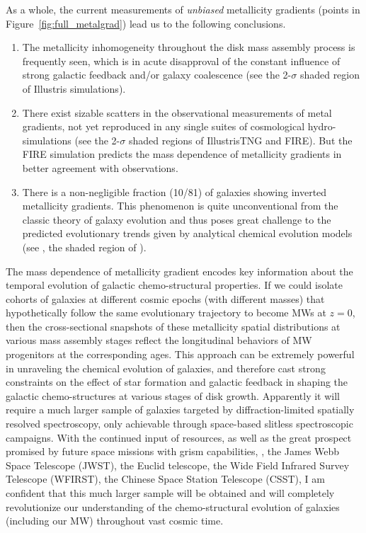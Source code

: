 As a whole, the current measurements of \emph{unbiased} metallicity gradients (points in Figure~\ref{fig:full_metalgrad}) lead us to the following conclusions.
\begin{enumerate}
    \item The metallicity inhomogeneity throughout the disk mass assembly process is frequently seen, which is
    in acute disapproval of the constant influence of strong galactic feedback and/or galaxy coalescence
    (see the 2-$\sigma$ shaded region of Illustris simulations).
    \item There exist sizable scatters in the observational measurements of metal gradients, not yet reproduced
    in any single suites of cosmological hydro-simulations (see the 2-$\sigma$ shaded regions of IllustrisTNG and
    FIRE). But the FIRE simulation predicts the mass dependence of metallicity gradients in better agreement with
    observations.
    \item There is a non-negligible fraction (10/81) of galaxies showing inverted metallicity gradients. This
    phenomenon is quite unconventional from the classic theory of galaxy evolution and thus poses great
    challenge to the predicted evolutionary trends given by analytical chemical evolution models (see \eg, the
    shaded region of \citet{Molla:2005eq}).
\end{enumerate}

The mass dependence of metallicity gradient encodes key information about the temporal evolution of galactic
chemo-structural properties.
If we could isolate cohorts of galaxies at different cosmic epochs (\ie with different masses) that 
hypothetically follow the same evolutionary trajectory to become MWs at $z=0$,
then the cross-sectional snapshots of these metallicity spatial distributions at various mass assembly stages
reflect the longitudinal behaviors of MW progenitors at the corresponding ages.
This approach can be extremely powerful in unraveling the chemical evolution of galaxies, and therefore cast 
strong constraints on the effect of star formation and galactic feedback in shaping the galactic chemo-structures
at various stages of disk growth.
Apparently it will require a much larger sample of galaxies targeted by diffraction-limited spatially resolved
spectroscopy, only achievable through space-based slitless spectroscopic campaigns.
With the continued input of \hst resources, as well as the great prospect promised by future space missions with
grism capabilities, \eg, the James Webb Space Telescope (JWST), the Euclid telescope, the Wide Field Infrared
Survey Telescope (WFIRST), the Chinese Space Station Telescope (CSST), I am confident that this much larger
sample will be obtained and will completely revolutionize our understanding of the chemo-structural evolution of 
galaxies (including our MW) throughout vast cosmic time.

